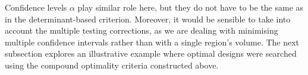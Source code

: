 Confidence levels $\alpha$  play similar role here, but they do not have to be the same as in the determinant-based criterion. Moreover, it would be sensible to take into account the multiple testing corrections, as we are dealing with minimising multiple confidence intervals rather than with a single region's volume. The next subsection explores an illustrative example where optimal designs were searched using the compound optimality criteria constructed above.